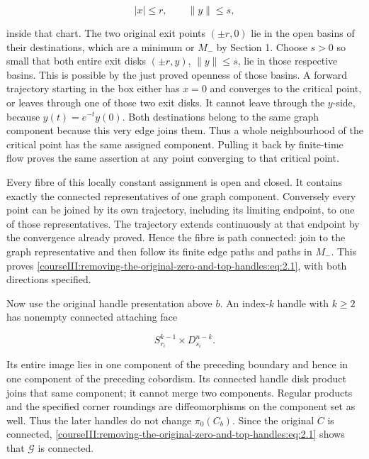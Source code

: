 \begin{equation}
|x|\leq r,\qquad \|y\|\leq s,
 \label{courseIII:removing-the-original-zero-and-top-handles:eq:2.2}
\end{equation}

inside that chart. The two original exit points \((\pm r,0)\) lie in the open basins of their destinations, which are a minimum or \(M_-\) by Section 1. Choose \(s>0\) so small that both entire exit disks \((\pm r,y)\), \(\|y\|\leq s\), lie in those respective basins. This is possible by the just proved openness of those basins. A forward trajectory starting in the box either has \(x=0\) and converges to the critical point, or leaves through one of those two exit disks. It cannot leave through the \(y\)-side, because \(y(t)=e^{-t}y(0)\). Both destinations belong to the same graph component because this very edge joins them. Thus a whole neighbourhood of the critical point has the same assigned component. Pulling it back by finite-time flow proves the same assertion at any point converging to that critical point.

Every fibre of this locally constant assignment is open and closed. It contains exactly the connected representatives of one graph component. Conversely every point can be joined by its own trajectory, including its limiting endpoint, to one of those representatives. The trajectory extends continuously at that endpoint by the convergence already proved. Hence the fibre is path connected: join to the graph representative and then follow its finite edge paths and paths in \(M_-\). This proves \eqref{courseIII:removing-the-original-zero-and-top-handles:eq:2.1}, with both directions specified.

Now use the original handle presentation above \(b\). An index-\(k\) handle with \(k\geq2\) has nonempty connected attaching face

\begin{equation}
S^{k-1}_{r_i}\times D^{n-k}_{s_i}.
 \label{courseIII:removing-the-original-zero-and-top-handles:eq:2.3}
\end{equation}

Its entire image lies in one component of the preceding boundary and hence in one component of the preceding cobordism. Its connected handle disk product joins that same component; it cannot merge two components. Regular products and the specified corner roundings are diffeomorphisms on the component set as well. Thus the later handles do not change \(\pi_0(C_b)\). Since the original \(C\) is connected, \eqref{courseIII:removing-the-original-zero-and-top-handles:eq:2.1} shows that \(\mathcal G\) is connected.

